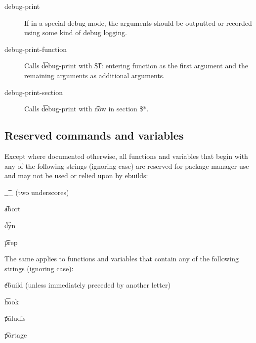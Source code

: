 \begin{description}
\item[debug-print] If in a special debug mode, the arguments should be outputted or recorded using
    some kind of debug logging.
\item[debug-print-function] Calls \t{debug-print} with \t{\$1: entering function} as the first
    argument and the remaining arguments as additional arguments.
\item[debug-print-section] Calls \t{debug-print} with \t{now in section \$*}.
\end{description}

\subsection{Reserved commands and variables}

Except where documented otherwise, all functions and variables that begin with any of the following
strings (ignoring case) are reserved for package manager use and may not be used or relied upon by
ebuilds:

\begin{compactitem}
\item \t{__} (two underscores)
\item \t{abort}
\item \t{dyn}
\item \t{prep}
\end{compactitem}

The same applies to functions and variables that contain any of the following strings (ignoring
case):
\nobreakpar
\begin{compactitem}
\item \t{ebuild} (unless immediately preceded by another letter)
\item \t{hook}
\item \t{paludis}
\item \t{portage}
\end{compactitem}


